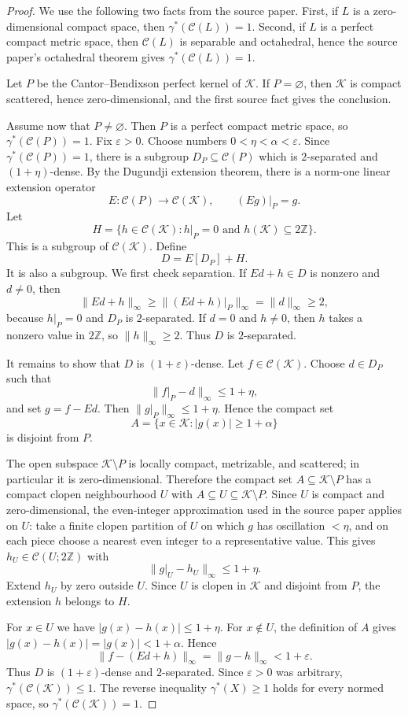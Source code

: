 \documentclass[11pt]{article}
\newcommand{\C}{\mathcal C}
\newcommand{\K}{\mathcal K}
\newcommand{\Z}{\mathbb Z}
\begin{document}
\begin{proof}
We use the following two facts from the source paper. First, if $L$ is a
zero-dimensional compact space, then $\gamma^*(\C(L))=1$. Second, if $L$ is a
perfect compact metric space, then $\C(L)$ is separable and octahedral, hence
the source paper's octahedral theorem gives $\gamma^*(\C(L))=1$.

Let $P$ be the Cantor--Bendixson perfect kernel of $\K$. If $P=\varnothing$,
then $\K$ is compact scattered, hence zero-dimensional, and the first source
fact gives the conclusion.

Assume now that $P\neq\varnothing$. Then $P$ is a perfect compact metric
space, so $\gamma^*(\C(P))=1$. Fix $\varepsilon>0$. Choose numbers
$0<\eta<\alpha<\varepsilon$. Since $\gamma^*(\C(P))=1$, there is a subgroup
$D_P\subseteq \C(P)$ which is $2$-separated and $(1+\eta)$-dense. By the
Dugundji extension theorem, there is a norm-one linear extension operator
\[
  E:\C(P)\longrightarrow \C(\K),\qquad (Eg)|_P=g .
\]
Let
\[
  H=\{h\in \C(\K): h|_P=0\text{ and }h(\K)\subseteq 2\Z\}.
\]
This is a subgroup of $\C(\K)$. Define
\[
  D=E[D_P]+H .
\]
It is also a subgroup. We first check separation. If $Ed+h\in D$ is nonzero
and $d\neq0$, then
\[
  \|Ed+h\|_\infty\geq \|(Ed+h)|_P\|_\infty=\|d\|_\infty\geq 2,
\]
because $h|_P=0$ and $D_P$ is $2$-separated. If $d=0$ and $h\neq0$, then
$h$ takes a nonzero value in $2\Z$, so $\|h\|_\infty\geq2$. Thus $D$ is
$2$-separated.

It remains to show that $D$ is $(1+\varepsilon)$-dense. Let $f\in \C(\K)$.
Choose $d\in D_P$ such that
\[
  \|f|_P-d\|_\infty\leq 1+\eta,
\]
and set $g=f-Ed$. Then $\|g|_P\|_\infty\leq 1+\eta$. Hence the compact set
\[
  A=\{x\in\K: |g(x)|\geq 1+\alpha\}
\]
is disjoint from $P$.

The open subspace $\K\setminus P$ is locally compact, metrizable, and
scattered; in particular it is zero-dimensional. Therefore the compact set
$A\subseteq \K\setminus P$ has a compact clopen neighbourhood $U$ with
$A\subseteq U\subseteq \K\setminus P$. Since $U$ is compact and
zero-dimensional, the even-integer approximation used in the source paper
applies on $U$: take a finite clopen partition of $U$ on which $g$ has
oscillation $<\eta$, and on each piece choose a nearest even integer to a
representative value. This gives $h_U\in \C(U;2\Z)$ with
\[
  \|g|_U-h_U\|_\infty\leq 1+\eta .
\]
Extend $h_U$ by zero outside $U$. Since $U$ is clopen in $\K$ and disjoint
from $P$, the extension $h$ belongs to $H$.

For $x\in U$ we have $|g(x)-h(x)|\leq1+\eta$. For $x\notin U$, the definition
of $A$ gives $|g(x)-h(x)|=|g(x)|<1+\alpha$. Hence
\[
  \|f-(Ed+h)\|_\infty=\|g-h\|_\infty<1+\varepsilon.
\]
Thus $D$ is $(1+\varepsilon)$-dense and $2$-separated. Since
$\varepsilon>0$ was arbitrary, $\gamma^*(\C(\K))\leq1$. The reverse
inequality $\gamma^*(X)\geq1$ holds for every normed space, so
$\gamma^*(\C(\K))=1$.
\end{proof}
\end{document}
